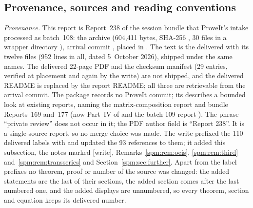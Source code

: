 \subsection{Provenance, sources and reading conventions}\label{spm:sec:provenance}
\begin{writenote}
\emph{Provenance.} This report is Report~238 of the session bundle that
ProveIt's  intake processed as batch~108: the archive
 (604{,}411 bytes, SHA-256
, 30 files in a wrapper directory
), arrival commit , placed in
. The text is the delivered  with its
twelve files  (952 lines in all, dated 5~October
2026), shipped under the same names. The delivered 22-page PDF and the
checksum manifest  (29 entries, verified at
placement and again by the write) are not shipped, and the delivered
README is replaced by the report README; all three are retrievable from
the arrival commit. The package records no ProveIt commit; its
 describes a bounded look at existing reports, naming
the matrix-composition report and bundle Reports~169 and~177 (now Part~IV
of  and the batch-109 report
). The phrase ``private review'' does
not occur in it; the PDF author field is ``Report 238''. It is a
single-source report, so no merge choice was made. The write prefixed
the 110 delivered labels with  and updated the 93 references
to them; it added this subsection, the notes marked [write],
Remarks~\ref{spm:rem:oeis}, \ref{spm:rem:third}
and~\ref{spm:rem:transseries} and Section~\ref{spm:sec:further}. Apart
from the label prefixes no theorem, proof or number of the source was
changed: the added statements are the last of their sections, the added
section comes after the last numbered one, and the added displays are
unnumbered, so every theorem, section and equation keeps its delivered
number.


\end{writenote}
